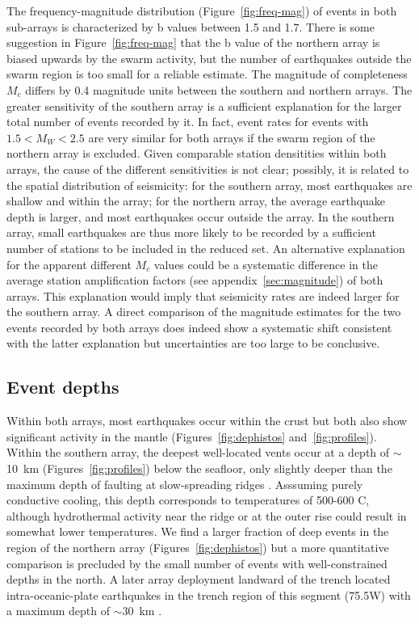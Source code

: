 \documentclass[reviewcopy]{elsart}
\begin{document}
The frequency-magnitude distribution (Figure~\ref{fig:freq-mag}) of
events in both sub-arrays is
characterized by b values between 1.5 and 1.7. 
There is
some suggestion in Figure~\ref{fig:freq-mag} that the b value of the northern array is biased upwards by
the swarm activity, but the number of earthquakes outside the swarm
region is too small for a reliable estimate. 
The magnitude of completeness $M_c$ differs by 0.4 magnitude units between
the southern and northern arrays.
The greater sensitivity of the southern array 
 is a sufficient  explanation for the larger total number of events
recorded by it.
  In fact, event rates for events with $1.5<M_W<2.5$
are very similar for both arrays if the swarm region of the northern array is
excluded.   Given comparable station densitities within both arrays,
the cause of the different sensitivities is not clear; possibly, it
is related to the spatial distribution of seismicity: for the
southern array, most earthquakes are shallow and within the array;
for the northern array, the average earthquake depth is larger, and
most earthquakes occur outside the array. In the southern array, small
earthquakes are thus more likely to be recorded by a sufficient number
of stations to be included in the reduced set. 
An alternative explanation for the apparent different $M_c$ values 
could be a systematic difference in the average station
amplification factors (see appendix~\ref{sec:magnitude}) of both
arrays. This explanation would imply that seismicity rates are indeed
larger for the southern array.  A direct comparison of the magnitude
estimates for the two events recorded by both arrays does indeed show
a systematic shift consistent with the latter explanation but
uncertainties are too large to be conclusive. 

\subsection{Event depths}

Within both arrays, most earthquakes occur within the crust but both
also show significant activity in the mantle
(Figures~\ref{fig:dephistos} and~\ref{fig:profiles}). Within the southern array, the deepest
well-located vents occur at a depth of
$\sim$10~km (Figures~\ref{fig:profiles}) below the seafloor, only slightly deeper than the
maximum depth of faulting at slow-spreading ridges
\citep[e.g.][]{toomey88,tilmann04}.  Asssuming purely conductive
cooling, this depth corresponds to temperatures of 500-600\dg
C, although hydrothermal activity  near the ridge or at the outer rise
could result in somewhat lower
 temperatures.  We find a
larger fraction of deep events in the region of the northern array
(Figures~\ref{fig:dephistos}) but
a more quantitative comparison is precluded by the small number of
events with well-constrained depths in the north. A later array
deployment landward of the trench located intra-oceanic-plate
earthquakes in the trench region of this segment (75.5\dg W) with a maximum depth of
$\sim$30~km \citep{lange07}. 
\end{document}
